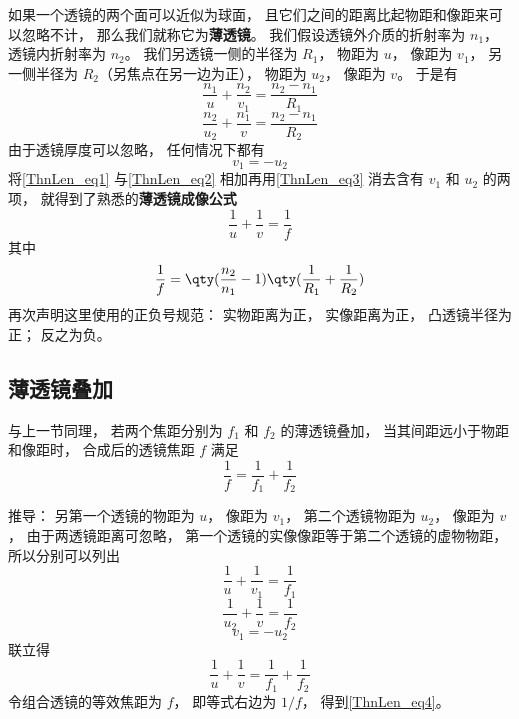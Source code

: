 如果一个透镜的两个面可以近似为球面， 且它们之间的距离比起物距和像距来可以忽略不计， 那么我们就称它为\textbf{薄透镜}。 我们假设透镜外介质的折射率为 $n_1$， 透镜内折射率为 $n_2$。 我们另透镜一侧的半径为 $R_1$， 物距为 $u$， 像距为 $v_1$， 另一侧半径为 $R_2$（另焦点在另一边为正）， 物距为 $u_2$， 像距为 $v$。 于是有
\begin{equation}\label{ThnLen_eq1}
\frac{n_1}{u} + \frac{n_2}{v_1} = \frac{n_2 - n_1}{R_1}
\end{equation}
\begin{equation}\label{ThnLen_eq2}
\frac{n_2}{u_2} + \frac{n_1}{v} = \frac{n_2 - n_1}{R_2}
\end{equation}
由于透镜厚度可以忽略， 任何情况下都有
\begin{equation}\label{ThnLen_eq3}
v_1 = -u_2
\end{equation}
将\autoref{ThnLen_eq1} 与\autoref{ThnLen_eq2} 相加再用\autoref{ThnLen_eq3} 消去含有 $v_1$ 和 $u_2$ 的两项， 就得到了熟悉的\textbf{薄透镜成像公式}
\begin{equation}
\frac{1}{u} + \frac{1}{v} = \frac{1}{f}
\end{equation}
其中
\begin{equation}
\frac{1}{f} = \qty(\frac{n_2}{n_1} - 1) \qty(\frac{1}{R_1} + \frac{1}{R_2})
\end{equation}
再次声明这里使用的正负号规范： 实物距离为正， 实像距离为正， 凸透镜半径为正； 反之为负。


\subsection{薄透镜叠加}
与上一节同理， 若两个焦距分别为 $f_1$ 和 $f_2$ 的薄透镜叠加， 当其间距远小于物距和像距时， 合成后的透镜焦距 $f$ 满足
\begin{equation}\label{ThnLen_eq4}
\frac{1}{f} = \frac{1}{f_1} + \frac{1}{f_2}
\end{equation}

推导： 另第一个透镜的物距为 $u$， 像距为 $v_1$， 第二个透镜物距为 $u_2$， 像距为 $v$， 由于两透镜距离可忽略， 第一个透镜的实像像距等于第二个透镜的虚物物距， 所以分别可以列出
\begin{equation}
\frac{1}{u} + \frac{1}{v_1} = \frac{1}{f_1}
\end{equation}
\begin{equation}
\frac{1}{u_2} + \frac{1}{v} = \frac{1}{f_2}
\end{equation}
\begin{equation}
v_1 = -u_2
\end{equation}
联立得
\begin{equation}
\frac{1}{u} + \frac{1}{v} = \frac{1}{f_1} + \frac{1}{f_2}
\end{equation}
令组合透镜的等效焦距为 $f$， 即等式右边为 $1/f$， 得到\autoref{ThnLen_eq4}。
